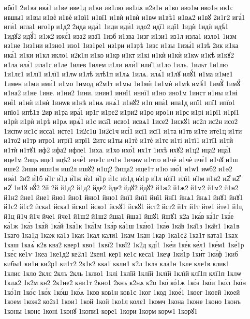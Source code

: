 {ибо́1
2и1ва
ива́1
и1ве
иве1д
и1ви
ив1лю
ив1лѧ
и2в1н
и1во
иво1м
иво1н
ив1с
ившы1
и1вы
и1вѐ
и1вѐ
и1вї1
и1вї1
и1вѝ
и1вѝ
и1вѡ
и1вѣ1
и1вѧ2
и1вꙋ
2и1г2
ига́1
иги́1
игла1
иго1р
и1д2
2ида
ида́1
1иди
иди́1
идо2
идї1
идї1
1идѝ
1идѝ
идѣ́1
1идꙋ2
идꙋ́1
и1ж2
ижє́1
иза2
иза̑1
1изб
и1зва
1изг
и1зи1
из1л
изла1
изло1
1изм
из1не
1из1ни
и1зно1
изо1
1из1ре1
из1ри
и1зрѣ
1изс
и1зы
1изы́1
и1зѣ
2ик
и1ка
ика́1
и1ки
и1кл
икло1
и2к1н
и1ко
и1кр
и1кт
и1кі
и1кѝ
и1кѝ
и1кѡ
и1кѣ
и1кꙋ2
и1ла
ила́1
ила1с
и1ле
1илев
1илем
и1ли
или́1
или̑1
и1ло
1иль.
1ильт
1и1лю
1и1лє1
и1лї1
и1лї1
и1лѡ
и1лѣ
илѣ1п
и1лѧ
1илѧ.
илѧ́1
и1лꙋ
илꙋ́1
и1ма
и1ме1
1имен
и1ми
ими́1
и1мо
1имод
и2м1т
и1мы
1и1мѝ
1и1мѝ
и1мѣ
имѣ́1
1имꙋ̀
1имꙋ́
и1на2
и1не
1ине.
и1ни2
1ини.
инин1
иннї1
иннї1
и1но
ино1м
1инст
и1ны
и1ні
ині́1
и1нѝ
и1нѝ
1инѡв
и1нѣ
и1нѧ
инѧ́1
и1нꙋ2
и1п
ипа́1
ипа1д
ипї1
ипї1
ипїо1
ипїо1
ипѣ1в
2ир
и1ра
ира́1
ир1г
и1ре2
и1ри2
и1ро
иро1н
и1рє
и1рі
и1рї1
и1рї1
и1рѝ
и1рѝ
и1рѣ
и1рѧ
ирѧ́1
и1с
иса̑1
исво1
исвѧ1
1исе2
1искꙋ1
ис2л
ис2н
исо2
1испѡ
ис1с
исса1
исте1
1и2с1ц
1и2с1ч
исі́1
исї1
исї1
и1та
и1тв
и1те
ите1ц
и1ти
и1то2
и1тр
итро1
итрї1
итрї1
2итс
и1ты
и1тѐ
и1тѐ
и1тє
и1ті
и1тї1
и1тї1
и1тѝ
и1тѝ
и1тꙋ1
иф2
ифа2
ифле1
1иха.
и1хо
ихо́1
их1т
1ихѣ
ихꙋ2
и1ц2
ица2
ица́1
ице1м
2ицъ
ицє1
ицѣ2
иче́1
иче1с
ич1н
1ичнѡ
и1что
и1чѐ
и1чѐ
ичє́1
и1чꙋ
и1ш
ише2
2иши
иши1н
иш2л
ишꙋ2
и1щ2
2ища2
ище1т
и1ю
ию́1
и1ѡ1
иѡб2
и1ѳ2
иѳа́1
2и҃2
и҆́1б
и҆́1г
и҆́1д
и҆́1ж
и҆́з1
и҆́1р
и҆́1с
и҆з1д
и҆з1р
и҆1л
и҆лї1
и҆лї1
и҆1м
и҆1н2
и2ⷤ
и2ⷨ
и2ⷯ
1и1ꙋ
иꙋ́2
2й
2й
й1д2
й1д2
йде2
йде2
йдꙋ2
йдꙋ2
й1ж2
й1ж2
й1м2
й1м2
й1н2
й1н2
йне1
йне1
йно1
йно1
йню1
йню1
йнї1
йнї1
йнї1
йнї1
йнѧ1
йнѧ1
йнꙋ1
йнꙋ1
й1с2
й1с2
йска1
йска1
йско1
йско1
йскꙋ1
йскꙋ1
йст2
йст2
й1т
й1т
йте1
йте1
й1ц
й1ц
й1ч
й1ч
йче1
йче1
й1ш2
й1ш2
йша1
йша1
йшꙋ1
йшꙋ1
к2а
1ка́в
ка́1г
1ка́е
ка́1ж
1ка́з
1ка́й
1ка́й
1ка́1к
1ка́1м
1ка́р
ка́1ш
1ка́ю1
1ка́ѳ
1ка̑в
1ка̑1з
1ка̑н1
1ка1в
1каго
1ка1д
1каж
ка1з
1как
1кал
кали1
1кам
1кан
1кар
1ка1с2
1ка1т
ката1
1ках
1каш
1каѧ́
к2в
ква2
квер1
кво1
1квї2
1квї2
1к2д
кді́1
1ке́и
1ке́к
ке́л1
1ке́м1
1ке́1р
1ке́с
ке́1ѵ
1кеа
1ке1д2
ке2л1
2кен1
кер1
ке1с
кеса1
1кеѱ
1ки́1р
1ки́т
1ки́ф
1киб
кибы1
ки1н
ки2р1
ки1т2
2к1к2
кка1
ккли1
к2л
1кла
кла1н
1кле
кле1в
клик1
1клис
1кло
2клс
2клъ
2кль
1клю1
1клі
1клїй
1клїй
1клїй
1клїй
клї1п
клї1п
1клѡ
1клѧ2
1к2м
кн2
2к1не2
кни1т
2кно1
2кнъ
к2нѧ
к2о
1ко̀
ко́1ж
1ко́з
1ко́и
1ко́л
1ко́н
1ко́1п
1ко́с
1ко́х
1ко́ш
1ко́ѧ
1ков
ков1н
ков1с
1ког
1код
1кое́1
1коег
1коей
1коей
1коем
1кож2
ко2з1
1кои1
1кой
1кой
1ко1л
колє1
1комч
1кона
1коне
1коно
1конъ
1коны
1конє
1коні
1конꙋ
1копи1
коре1
1кори
1корм
корѡ1
1корꙋ1
}
